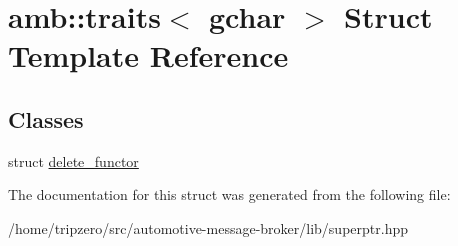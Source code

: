 \hypertarget{structamb_1_1traits_3_01gchar_01_4}{\section{amb\-:\-:traits$<$ gchar $>$ Struct Template Reference}
\label{structamb_1_1traits_3_01gchar_01_4}
}
\subsection*{Classes}
\begin{DoxyCompactItemize}
\item 
struct \hyperlink{structamb_1_1traits_3_01gchar_01_4_1_1delete__functor}{delete\-\_\-functor}
\end{DoxyCompactItemize}


The documentation for this struct was generated from the following file\-:\begin{DoxyCompactItemize}
\item 
/home/tripzero/src/automotive-\/message-\/broker/lib/superptr.\-hpp\end{DoxyCompactItemize}
